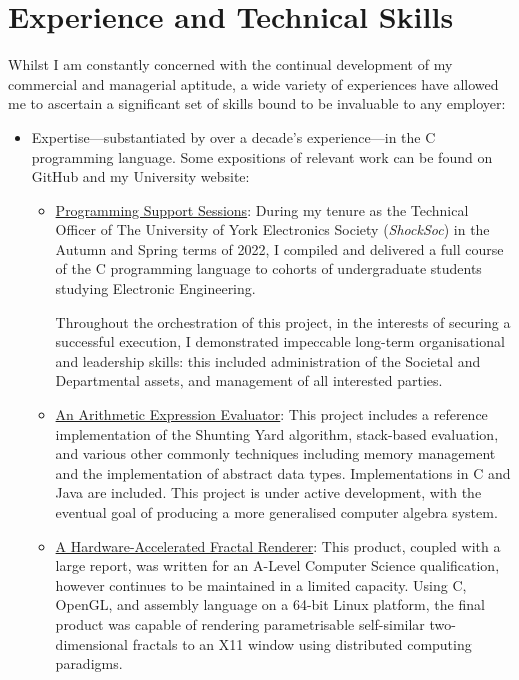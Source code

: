 \documentclass{article}
\newcommand{\smallmargin}[1]{\marginpar{\raggedright\footnotesize #1}}
\newcommand{\githublink}[2]{\href{https://github.com/oliverdixon/#1}{#2}}
\newcommand{\weblink}[2]{\href{https://www-users.york.ac.uk/~od641/#1}{#2}}
\begin{document}
\section{Experience and Technical Skills}
Whilst I am constantly concerned with the continual development of my commercial
and managerial aptitude, a wide variety of experiences have allowed me to
ascertain a significant set of skills bound to be invaluable to any employer:
\begin{itemize}
        \item Expertise---substantiated by over a decade's experience---in the C
        programming language. Some expositions of relevant work can be found on
        GitHub and my University website:
        \begin{itemize}
                \item \weblink{pss}{Programming Support Sessions}: During my
                tenure as the Technical Officer of The University of York
                Electronics Society (\textit{ShockSoc}) in the Autumn and Spring
                terms of 2022, I compiled and delivered a full course of the C
                programming language to cohorts of undergraduate students
                studying Electronic Engineering.

                Throughout the orchestration of this project, in the interests
                of securing a successful execution, I demonstrated impeccable
                long-term organisational and leadership skills: this included
                administration of the Societal and Departmental assets, and
                management of all interested parties.

                \item \githublink{calculator-demo}{An Arithmetic Expression
                Evaluator}: This project includes a reference implementation of
                the Shunting Yard algorithm, stack-based evaluation, and various
                other commonly techniques including memory management and the
                implementation of abstract data types.  Implementations in C and
                Java are included. This project is under active development,
                with the eventual goal of producing a more generalised computer
                algebra system.

                \item \smallmargin{\color{red}{Drafting note: As requested, I
                have omitted some superfluous detail from these project
                descriptions. Some soft-skills are also mentioned here and in
                the ``Summary'' section.}}%
                \weblink{fractal}{A Hardware-Accelerated Fractal Renderer}:
                This product, coupled with a large report, was
                written for an A-Level Computer Science qualification, however
                continues to be maintained in a limited capacity. Using C,
                OpenGL, and assembly language on a 64-bit Linux platform, the
                final product was capable of rendering parametrisable
                self-similar two-dimensional fractals to an X11 window using
                distributed computing paradigms.


\end{itemize}
\end{itemize}
\end{document}
